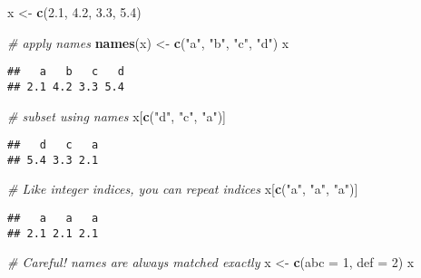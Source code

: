\documentclass[
]{book}
\newenvironment{Shaded}{\begin{snugshade}}{\end{snugshade}}
\newcommand{\CommentTok}[1]{\textcolor[rgb]{0.56,0.35,0.01}{\textit{#1}}}
\newcommand{\DataTypeTok}[1]{\textcolor[rgb]{0.13,0.29,0.53}{#1}}
\newcommand{\DecValTok}[1]{\textcolor[rgb]{0.00,0.00,0.81}{#1}}
\newcommand{\FloatTok}[1]{\textcolor[rgb]{0.00,0.00,0.81}{#1}}
\newcommand{\KeywordTok}[1]{\textcolor[rgb]{0.13,0.29,0.53}{\textbf{#1}}}
\newcommand{\NormalTok}[1]{#1}
\newcommand{\StringTok}[1]{\textcolor[rgb]{0.31,0.60,0.02}{#1}}
\begin{document}
\begin{Shaded}
\begin{Highlighting}[]
\NormalTok{x \textless{}{-}}\StringTok{ }\KeywordTok{c}\NormalTok{(}\FloatTok{2.1}\NormalTok{, }\FloatTok{4.2}\NormalTok{, }\FloatTok{3.3}\NormalTok{, }\FloatTok{5.4}\NormalTok{)}

\CommentTok{\# apply names}
\KeywordTok{names}\NormalTok{(x) \textless{}{-}}\StringTok{ }\KeywordTok{c}\NormalTok{(}\StringTok{"a"}\NormalTok{, }\StringTok{"b"}\NormalTok{, }\StringTok{"c"}\NormalTok{, }\StringTok{"d"}\NormalTok{)}
\NormalTok{x}
\end{Highlighting}
\end{Shaded}

\begin{verbatim}
##   a   b   c   d 
## 2.1 4.2 3.3 5.4
\end{verbatim}

\begin{Shaded}
\begin{Highlighting}[]
\CommentTok{\# subset using names}
\NormalTok{x[}\KeywordTok{c}\NormalTok{(}\StringTok{"d"}\NormalTok{, }\StringTok{"c"}\NormalTok{, }\StringTok{"a"}\NormalTok{)]}
\end{Highlighting}
\end{Shaded}

\begin{verbatim}
##   d   c   a 
## 5.4 3.3 2.1
\end{verbatim}

\begin{Shaded}
\begin{Highlighting}[]
\CommentTok{\# Like integer indices, you can repeat indices}
\NormalTok{x[}\KeywordTok{c}\NormalTok{(}\StringTok{"a"}\NormalTok{, }\StringTok{"a"}\NormalTok{, }\StringTok{"a"}\NormalTok{)]}
\end{Highlighting}
\end{Shaded}

\begin{verbatim}
##   a   a   a 
## 2.1 2.1 2.1
\end{verbatim}

\begin{Shaded}
\begin{Highlighting}[]
\CommentTok{\# Careful! names are always matched exactly}
\NormalTok{x \textless{}{-}}\StringTok{ }\KeywordTok{c}\NormalTok{(}\DataTypeTok{abc =} \DecValTok{1}\NormalTok{, }\DataTypeTok{def =} \DecValTok{2}\NormalTok{)}
\NormalTok{x}
\end{Highlighting}
\end{Shaded}
\end{document}
